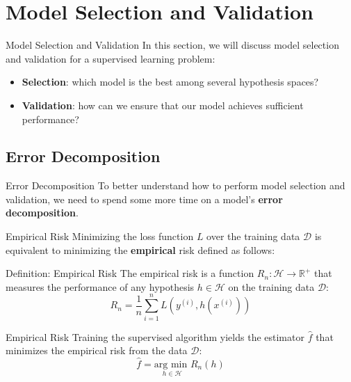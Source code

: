 \section[Model Selection and Validation]{Model Selection and Validation}

\begin{frame}{Model Selection and Validation}
	In this section, we will discuss model selection and validation for a supervised learning problem: \\
	\vspace{0.5cm}
	\begin{itemize}
		\item \textbf{Selection}: which model is the best among several hypothesis spaces?
		\item \textbf{Validation}: how can we ensure that our model achieves sufficient performance?
	\end{itemize}
\end{frame}

\subsection{Error Decomposition}

\begin{frame}{Error Decomposition}
	To better understand how to perform model selection and validation, we need to spend some more time on a model's \textbf{error decomposition}.
\end{frame}

\begin{frame}{Empirical Risk}
	Minimizing the loss function $L$ over the training data $\mathcal{D}$ is equivalent to minimizing the \textbf{empirical} risk defined as follows:
	\begin{block}{Definition: Empirical Risk}
		The empirical risk is a function $R_n: \mathcal{H} \to \mathbb{R}^+$ that measures the performance of any hypothesis $h \in \mathcal{H}$ on the training data $\mathcal{D}$:
		\begin{equation}
			R_n = \frac{1}{n} \sum_{i=1}^n L\left(y^{(i)}, h\left(x^{(i)}\right)\right)
			\nonumber
		\end{equation}
		\hfill
	\end{block}
\end{frame}

\begin{frame}{Empirical Risk}
	Training the supervised algorithm yields the estimator $\hat{f}$ that minimizes the empirical risk from the data $\mathcal{D}$:
	\begin{equation}
		\hat{f} = \underset{h \in \mathcal{H}}{\text{arg min  }}R_n(h)
		\nonumber
	\end{equation}
\end{frame}

